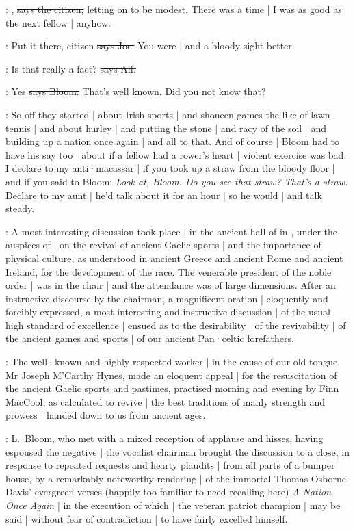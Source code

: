 \citizen:
,
\sout{says the citizen,}
letting on to be modest.
There was a time |
I was as good as the next fellow |
anyhow.

\joe:
Put it there,
citizen
\sout{says Joe.}
You were |
and a bloody sight better.

\bergan:
Is that really a fact?
\sout{says Alf.}

\Bloom:
Yes
\sout{says Bloom.}
That's well known.
Did you not know that?

\Nq:
So off they started |
about Irish sports |
and shoneen games the like of lawn tennis |
and about hurley
 |
and putting the stone |
and racy of the soil |
and building up a nation once again |
and all to that.
And of course |
Bloom had to have his say too |
about if a fellow had a rower's heart |
violent exercise was bad.
I declare to my anti·macassar |
if you took up a straw from the bloody floor |
and if you said to Bloom:
\emph{Look at,
Bloom.
Do you see that straw?
That's a straw.}
Declare to my aunt |
he'd talk about it for an hour |
so he would |
and talk steady.

:
A most interesting discussion took place |
in the ancient hall of
in ,
under the auspices of ,
on the revival of ancient Gaelic sports |
and the importance of physical culture,
as understood in ancient Greece and ancient Rome and ancient Ireland,
for the development of the race.
The venerable president of the noble order |
was in the chair |
and the attendance was of large dimensions.
After an instructive discourse by the chairman,
a magnificent oration |
eloquently and forcibly expressed,
a most interesting and instructive discussion |
of the usual high standard of excellence |
ensued as to the desirability |
of the revivability |
of the ancient games and sports |
of our ancient Pan·celtic forefathers.

:
The well·known and highly respected worker |
in the cause of our old tongue,
Mr Joseph M'Carthy Hynes,
made an eloquent appeal |
for the resuscitation of the ancient Gaelic sports and pastimes,
practised morning and evening by Finn MacCool,
as calculated to revive |
the best traditions of manly strength and prowess |
handed down to us from ancient ages.

:
L.~Bloom,
who met with a mixed reception of applause and hisses,
having espoused the negative |
the vocalist chairman brought the discussion to a close,
in response to repeated requests and hearty plaudits |
from all parts of a bumper house,
by a remarkably noteworthy rendering |
of the immortal Thomas Osborne Davis' evergreen verses
(happily too familiar to need recalling here)
\emph{A Nation Once Again} |
in the execution of which |
the veteran patriot champion |
may be said |
without fear of contradiction |
to have fairly excelled himself.

